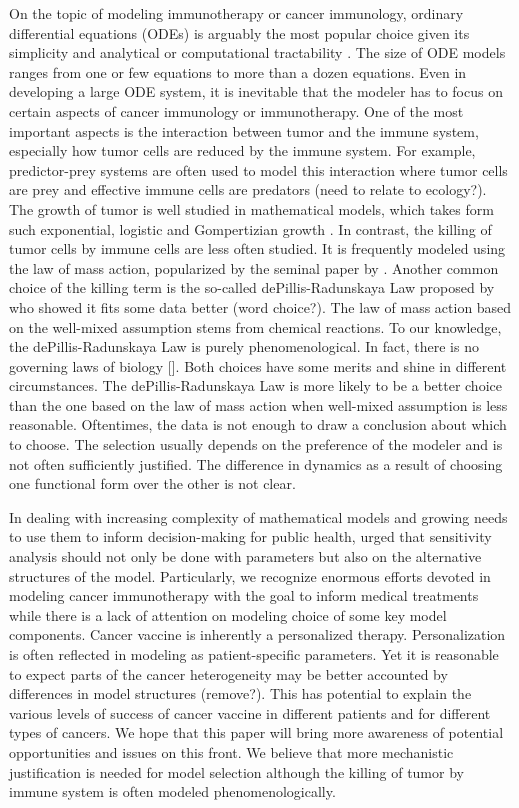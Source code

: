 \documentclass[review,authoryear]{elsarticle}
\begin{document}
On the topic of modeling immunotherapy or cancer immunology, ordinary
differential equations (ODEs) is arguably the most popular choice
given its simplicity and analytical or computational tractability
\citep{Eftimie2010}. The size of ODE models ranges from one or few
equations to more than a dozen equations. Even in developing a large
ODE system, it is inevitable that the modeler has to focus on certain
aspects of cancer immunology or immunotherapy. One of the most important
aspects is the interaction between tumor and the immune system, especially
how tumor cells are reduced by the immune system. For example, predictor-prey
systems are often used to model this interaction where tumor cells
are prey and effective immune cells are predators (need to relate
to ecology?). The growth of tumor is well studied in mathematical
models, which takes form such exponential, logistic and Gompertizian
growth \citep{Murphy2016}. In contrast, the killing of tumor cells
by immune cells are less often studied. It is frequently modeled using
the law of mass action, popularized by the seminal paper by \citet{Kuznetsov1994}.
Another common choice of the killing term is the so-called dePillis-Radunskaya
Law proposed by \citet{dePillis2014} who showed it fits some data
better (word choice?). The law of mass action based on the well-mixed
assumption stems from chemical reactions. To our knowledge, the dePillis-Radunskaya
Law is purely phenomenological. In fact, there is no governing laws
of biology {[}{]}. Both choices have some merits and shine in different
circumstances. The dePillis-Radunskaya Law is more likely to be a
better choice than the one based on the law of mass action when well-mixed
assumption is less reasonable. Oftentimes, the data is not enough
to draw a conclusion about which to choose. The selection usually depends on the preference
of the modeler and is not often sufficiently justified. The difference in dynamics
as a result of choosing one functional form over the other is not
clear. 

In dealing with increasing complexity of mathematical models and growing
needs to use them to inform decision-making for public health, \citet{Basu2013} urged that sensitivity analysis should
not only be done with parameters but also on the alternative structures
of the model. Particularly, we recognize enormous efforts devoted
in modeling cancer immunotherapy with the goal to inform medical treatments
while there is a lack of attention on modeling choice of some key
model components. Cancer vaccine is inherently a personalized
therapy. Personalization is often reflected in modeling as patient-specific
parameters. Yet it is reasonable to expect parts of the cancer heterogeneity
may be better accounted by differences in model structures (remove?).
This has potential to explain the various levels of success of cancer
vaccine in different patients and for different types of cancers. We
hope that this paper will bring more awareness of potential opportunities
and issues on this front. We believe that more mechanistic justification
is needed for model selection although the killing of tumor by immune
system is often modeled phenomenologically.
\end{document}
